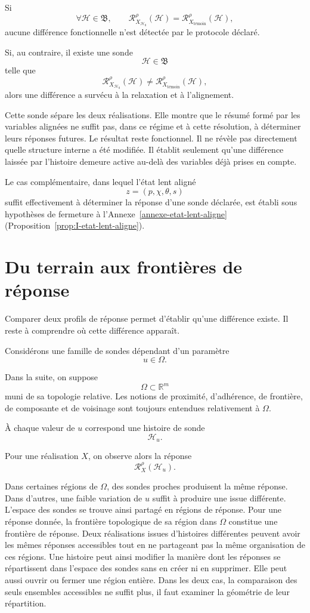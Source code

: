 Si
\[
\forall \mathcal H\in\mathfrak B,
\qquad
\mathcal R_{X_{\mathcal H_0}}^{\rho}(\mathcal H)
=
\mathcal R_{X_{\text{t\'emoin}}}^{\rho}(\mathcal H),
\]
aucune différence fonctionnelle n'est détectée par le protocole déclaré.

Si, au contraire, il existe une sonde
\[
\mathcal H\in\mathfrak B
\]
telle que
\[
\mathcal R_{X_{\mathcal H_0}}^{\rho}(\mathcal H)
\neq
\mathcal R_{X_{\text{t\'emoin}}}^{\rho}(\mathcal H),
\]
alors une différence a survécu à la relaxation et à l'alignement.

Cette sonde sépare les deux réalisations. Elle montre que le résumé formé par les variables alignées ne suffit pas, dans ce régime et à cette résolution, à déterminer leurs réponses futures. Le résultat reste fonctionnel. Il ne révèle pas directement quelle structure interne a été modifiée. Il établit seulement qu'une différence laissée par l'histoire demeure active au-delà des variables déjà prises en compte.

Le cas complémentaire, dans lequel l'état lent aligné
\[
z=(p,\chi,\theta,s)
\]
suffit effectivement à déterminer la réponse d'une sonde déclarée, est établi sous hypothèses de fermeture à l'Annexe~\ref{annexe-etat-lent-aligne} (Proposition~\ref{prop:I-etat-lent-aligne}).

\section{Du terrain aux frontières de réponse}
\label{t3-terrain-frontieres-reponse}

Comparer deux profils de réponse permet d'établir qu'une différence
existe. Il reste à comprendre où cette différence apparaît.

Considérons une famille de sondes dépendant d'un paramètre
\[
u\in\Omega.
\]

Dans la suite, on suppose
\[
\Omega\subset\mathbb R^m
\]
muni de sa topologie relative. Les notions de proximité, d'adhérence,
de frontière, de composante et de voisinage sont toujours entendues
relativement à \(\Omega\).

À chaque valeur de $u$ correspond une histoire de sonde
\[
\mathcal H_u.
\]

Pour une réalisation $X$, on observe alors la réponse
\[
\mathcal R_X^\rho(\mathcal H_u).
\]

Dans certaines régions de \(\Omega\), des sondes proches produisent la même réponse. Dans d'autres, une faible variation de $u$ suffit à produire une issue différente. L'espace des sondes se trouve ainsi partagé en régions de réponse. Pour une réponse donnée, la frontière topologique de sa région dans \(\Omega\) constitue une frontière de réponse. Deux réalisations issues d'histoires différentes peuvent avoir les mêmes réponses accessibles tout en ne partageant pas la même organisation de ces régions. Une histoire peut ainsi modifier la manière dont les réponses se répartissent dans l'espace des sondes sans en créer ni en supprimer. Elle peut aussi ouvrir ou fermer une région entière. Dans les deux cas, la comparaison des seuls ensembles accessibles ne suffit plus, il faut examiner la géométrie de leur répartition.


